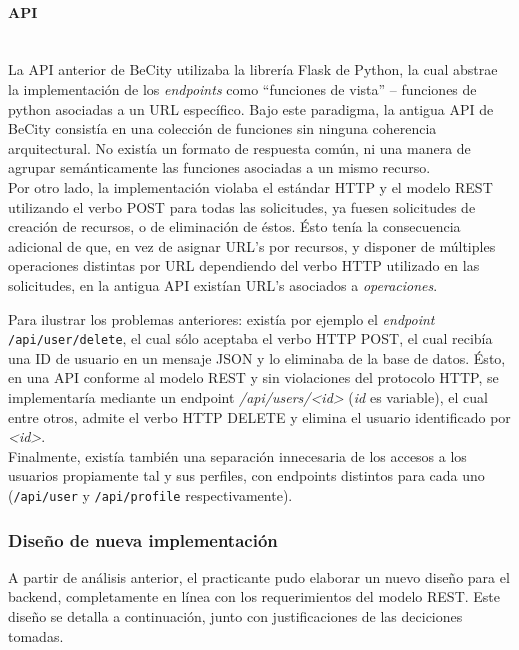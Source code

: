 \documentclass[11pt,letterpaper]{article}
\begin{document}
\paragraph{API\\\\}

La API anterior de BeCity utilizaba la librería Flask de Python, la cual abstrae la implementación de los \emph{endpoints} como ``funciones de vista'' -- funciones de python asociadas a un URL específico. Bajo este paradigma, la antigua API de BeCity consistía en una colección de funciones sin ninguna coherencia arquitectural. No existía un formato de respuesta común, ni una manera de agrupar semánticamente las funciones asociadas a un mismo recurso. \\

Por otro lado, la implementación violaba el estándar HTTP y el modelo REST utilizando el verbo POST para todas las solicitudes, ya fuesen solicitudes de creación de recursos, o de eliminación de éstos. Ésto tenía la consecuencia adicional de que, en vez de asignar URL's por recursos, y disponer de múltiples operaciones distintas por URL dependiendo del verbo HTTP utilizado en las solicitudes, en la antigua API existían URL's asociados a \emph{operaciones}.

Para ilustrar los problemas anteriores: existía por ejemplo el \emph{endpoint} \texttt{/api/user/delete}, el cual sólo aceptaba el verbo HTTP POST, el cual recibía una ID de usuario en un mensaje JSON y lo eliminaba de la base de datos. Ésto, en una API conforme al modelo REST y sin violaciones del protocolo HTTP, se implementaría mediante un endpoint \emph{/api/users/\textless id\textgreater} (\emph{id} es variable), el cual entre otros, admite el verbo HTTP DELETE y elimina el usuario identificado por \emph{\textless id\textgreater}.\\

Finalmente, existía también una separación innecesaria de los accesos a los usuarios propiamente tal y sus perfiles, con endpoints distintos para cada uno (\texttt{/api/user} y \texttt{/api/profile} respectivamente).

\newpage
\subsubsection{Diseño de nueva implementación}

A partir de análisis anterior, el practicante pudo elaborar un nuevo diseño para el backend, completamente en línea con los requerimientos del modelo REST. Este diseño se detalla a continuación, junto con justificaciones de las deciciones tomadas.
\end{document}

